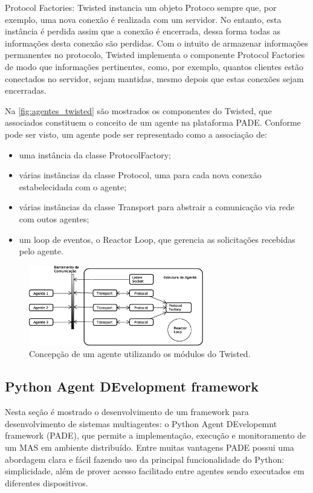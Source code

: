 \documentclass[journal]{IEEEtran}
\begin{document}
Protocol Factories: Twisted instancia um objeto Protoco sempre que, por exemplo, uma nova conexão é realizada com um servidor. No entanto, esta instância é perdida assim que a conexão é encerrada, dessa forma todas as informações desta conexão são perdidas. Com o intuito de armazenar informações permanentes no protocolo, Twisted implementa o componente Protocol Factories de modo que informações pertinentes, como, por exemplo, quantos clientes estão conectados no servidor, sejam mantidas, mesmo depois que estas conexões sejam encerradas.

Na \autoref{fig:agentes_twisted} são mostrados os componentes do Twisted, que associados constituem o conceito de um agente na plataforma PADE. Conforme pode ser visto, um agente pode ser representado como a associação de:
\begin{itemize}
  \item uma instância da classe ProtocolFactory;
  \item várias instâncias da classe Protocol, uma para cada nova conexão estabelecidada com o agente;
  \item várias instâncias da classe Transport para abstrair a comunicação via rede com outos agentes;
  \item um loop de eventos, o Reactor Loop, que gerencia as solicitações recebidas pelo agente.
\end{itemize}

\begin{figure}[htb]
    \centering
    \includegraphics[width=3.0in]{Figuras/agente_twisted.eps}
    
    \caption{\label{fig:agentes_twisted} Concepção de um agente utilizando os módulos do Twisted.}
\end{figure}

\subsection{Python Agent DEvelopment framework}

Nesta seção é mostrado o desenvolvimento de um framework para desenvolvimento de sistemas multiagentes: o Python Agent DEvelopemnt framework (PADE), que permite a implementação, execução e monitoramento de um MAS em ambiente distribuído. Entre muitas vantagens PADE possui uma abordagem clara e fácil fazendo uso da principal funcionalidade do Python: simplicidade, além de prover acesso facilitado entre agentes sendo executados em diferentes dispositivos.
\end{document}
